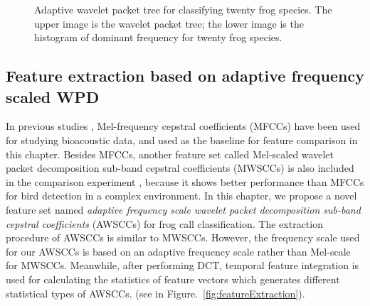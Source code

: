 \begin{figure}[htb!] %
\caption[Adaptive wavelet packet tree for classifying twenty frog species]{Adaptive wavelet packet tree for classifying twenty frog species. The upper image is the wavelet packet tree; the lower image is the histogram of dominant frequency for twenty frog species.}
\label{fig:tree20} 
\end{figure}



\subsection{Feature extraction based on adaptive frequency scaled WPD}

In previous studies \citep{bedoya2014automatic, Xie1504:Acoustic}, Mel-frequency cepstral coefficients (MFCCs) have been used for studying bioacoustic data, and used as the baseline for feature comparison in this chapter. Besides MFCCs, another feature set called Mel-scaled wavelet packet decomposition sub-band cepstral coefficients (MWSCCs) is also included in the comparison experiment \citep{Zhang2015108}, because it shows better performance than MFCCs for bird detection in a complex environment. In this chapter, we propose a novel feature set named \textit{adaptive frequency scale wavelet packet decomposition sub-band cepstral coefficients} (AWSCCs) for frog call classification.
The extraction procedure of AWSCCs is similar to MWSCCs. However, the frequency scale used for our AWSCCs is based on an adaptive frequency scale rather than Mel-scale for MWSCCs. Meanwhile, after performing DCT, temporal feature integration is used for calculating the statistics of feature vectors which generates different statistical types of AWSCCs. (see in Figure.~\ref{fig:featureExtraction}). 


